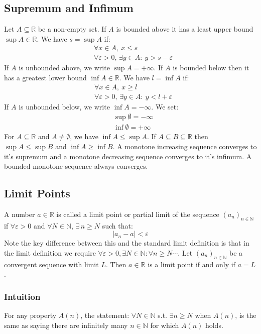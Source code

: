 \documentclass[12pt]{article}
\newcommand{\seq}[2]{(#1_#2)_{#2\in\mathbb{N}}}
\begin{document}
\subsection{Supremum and Infimum}
Let \(A\subseteq \mathbb{R}\) be a non-empty set. If \(A\) is bounded above it has a least upper bound \(\sup A\in \mathbb{R}\). We have \(s=\sup A\) if:
\begin{align*}
    &\forall x\in A,\ x\leq s \\
    &\forall \varepsilon>0,\, \exists y\in A:\ y>s-\varepsilon
\end{align*}
If \(A\) is unbounded above, we write \(\sup A=+\infty\). If \(A\) is bounded below then it has a greatest lower bound \(\inf A\in\mathbb{R}\). We have \(l=\inf A\) if:
\begin{align*}
    &\forall x\in A,\ x\geq l \\
    &\forall \varepsilon>0,\, \exists y\in A:\ y<l+\varepsilon
\end{align*}
If \(A\) is unbounded below, we write \(\inf A=-\infty\). We set:
\begin{align*}
    &\sup \emptyset =-\infty \\
    &\inf \emptyset = +\infty
\end{align*}
For \(A\subseteq \mathbb{R}\) and \(A\ne\emptyset\), we have \(\inf A\leq \sup A\). If \(A\subseteq B\subseteq \mathbb{R}\) then \(\sup A\leq \sup B\) and \(\inf A \geq \inf B\). A monotone increasing sequence converges to it's supremum and a monotone decreasing sequence converges to it's infimum. A bounded monotone sequence always converges.
\subsection{Limit Points}
A number \(a\in\mathbb{R}\) is called a limit point or partial limit of the sequence \(\seq{a}{n}\) if \(\forall\varepsilon>0\) and \(\forall N\in\mathbb{N}\), \(\exists\, n\geq N\) such that:
\[|a_n-a|<\varepsilon\]
Note the key difference between this and the standard limit definition is that in the limit definition we require \(\forall\varepsilon>0, \exists N\in\mathbb{N}: \forall n\geq N\cdots\). Let \(\seq{a}{n}\) be a convergent sequence with limit \(L\). Then \(a\in\mathbb{R}\) is a limit point if and only if \(a=L\).
\subsubsection{Intuition}
For any property \(A(n)\), the statement: \(\forall N\in\mathbb{N}\) s.t. \(\exists n\geq N\) when \(A(n)\), is the same as saying there are infinitely many \(n\in\mathbb{N}\) for which \(A(n)\) holds.
\end{document}
